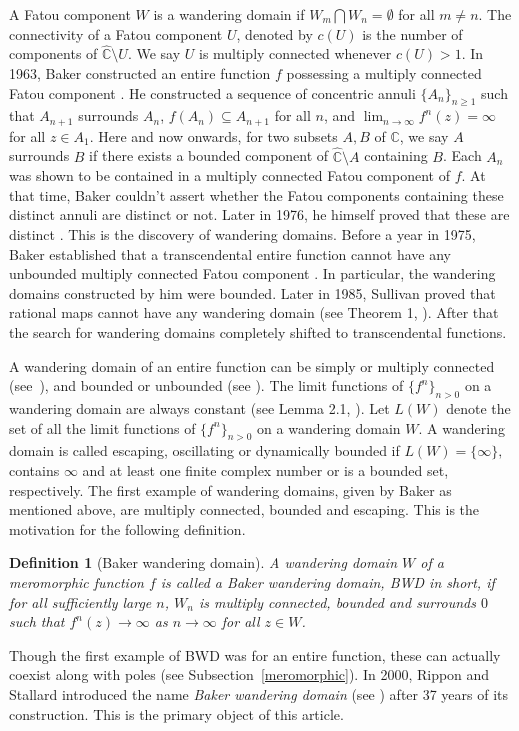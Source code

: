 \documentclass[11pt,a4paper]{article}
\newtheorem{definition}{Definition}[section]
\begin{document}
		A Fatou component $W$ is a wandering domain if $W_m\bigcap W_n=\emptyset$ for all $m\neq n$.  The connectivity of a Fatou component $U$, denoted by $c(U)$ is the number of components of $\widehat{\mathbb{C}} \setminus U$. We say $U$ is multiply connected whenever $c(U)>1$. In 1963, Baker constructed an entire function $f$ possessing a multiply connected Fatou component \cite{Baker 1963}. He constructed a sequence of concentric annuli  $\{A_n\}_{n\geq 1}$ such that $A_{n+1}$ surrounds $A_n$, $f(A_n)\subseteq A_{n+1}$ for all $n$, and   $\lim_{n \to \infty} f^n(z) = \infty$ for all $z\in A_1$. Here and now onwards, for two subsets $A,B$ of $\mathbb{C}$, we say $A$ surrounds  $B$ if there exists a bounded component of $\mathbb{{\widehat{C}}}\setminus A$   containing $B$. Each $A_n$ was shown to be contained in a multiply connected Fatou component of $f$. At that time, Baker couldn't assert whether the Fatou components containing these distinct annuli are distinct or not. Later in 1976, he himself proved that these are distinct \cite{Baker 1976}. This is the discovery of wandering domains. Before a year in 1975, Baker established that a transcendental entire function cannot have any unbounded multiply connected Fatou component \cite{Baker 1975}. In particular, the wandering domains constructed by him were bounded. 
 Later in 1985, Sullivan  proved that rational maps cannot have any wandering domain (see Theorem 1, \cite{Sullivan 1985}). 
  After that the search for wandering domains completely shifted to transcendental functions.
  \par  A wandering domain of an entire function can be simply or multiply connected (see~\cite{Baker 1976,Baker 1984}), and bounded or unbounded (see \cite{EremenkoLyubich 1987}). The limit functions of $\{f^n\}_{n>0}$ on a wandering domain are always constant (see Lemma 2.1, \cite{bk3}). Let $L(W)$  denote the set of all the limit functions of $\{f^n\}_{n>0}$ on a wandering domain $W$. A wandering domain is called escaping, oscillating or dynamically bounded if $L(W) =\{\infty\}, $ contains $\infty$ and at least one finite complex number or is a bounded set, respectively. The first example of wandering domains, given by Baker as mentioned above, are  multiply connected, bounded  and escaping. This is the motivation for the following definition.  
  
	\begin{definition}[Baker wandering domain]
		A wandering domain $W$ of a meromorphic function $f$ is called a Baker wandering domain, \textit{BWD} in short,  if for all sufficiently large $n$, $W_n$ is multiply connected, bounded and surrounds $0$ such that $f^n(z)\to \infty$ as $n\to \infty$ for all $z\in W$.
	\end{definition}
Though the first example of BWD was for an entire function, these can actually coexist along with poles (see Subsection~\ref{meromorphic}). In 2000, Rippon and Stallard introduced the name {\it{Baker wandering domain}} (see \cite{RipponStallard 2000}) after 37 years of its construction. This is the primary object of this article. 
\end{document}
